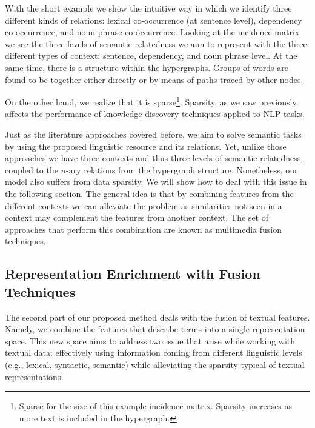 With the short example we show the intuitive way in which we identify three different kinds of relations: lexical co-occurrence (at sentence level), dependency co-occurrence, and noun phrase co-occurrence. Looking at the incidence matrix we see the three levels of semantic relatedness we aim to represent with the three different types of context: sentence, dependency, and noun phrase level. At the same time, there is a structure within the hypergraphs. Groups of words are found to be together either directly or by means of paths traced by other nodes. 

On the other hand, we realize that it is sparse\footnote{Sparse for the  size of this example incidence matrix. Sparsity increases as more text is included in the hypergraph.}. Sparsity, as we saw previously, affects the performance of knowledge discovery techniques applied to NLP tasks. 

Just as the literature approaches covered before, we aim to solve semantic tasks by using the proposed linguistic resource and its relations. Yet, unlike those approaches we have three contexts and thus three levels of semantic relatedness, coupled to the $n$-ary relations from the hypergraph structure. Nonetheless, our model also suffers from data sparsity. We will show how to deal with this issue in the following section. The general idea is that by combining features from the different contexts we can alleviate the problem as similarities not seen in a context may complement the features from another context. The set of approaches that perform this combination are known as multimedia fusion techniques.




                                                                                            
\subsection{Representation Enrichment with Fusion Techniques}\label{sec:fusion}
 
The second part of our proposed method deals with the fusion of textual features. Namely, we combine the features that describe terms into a single representation space. This new space aims to address two issue that arise while working with textual data: effectively using information coming from different linguistic levels (e.g., lexical, syntactic, semantic) while alleviating the sparsity typical of textual representations.

